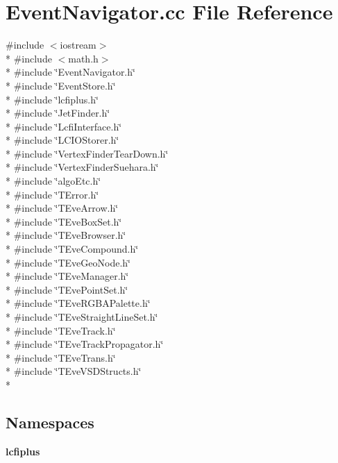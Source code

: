 \section{Event\-Navigator.\-cc File Reference}
\label{EventNavigator_8cc}
{\ttfamily \#include $<$iostream$>$}\\*
{\ttfamily \#include $<$math.\-h$>$}\\*
{\ttfamily \#include \char`\"{}Event\-Navigator.\-h\char`\"{}}\\*
{\ttfamily \#include \char`\"{}Event\-Store.\-h\char`\"{}}\\*
{\ttfamily \#include \char`\"{}lcfiplus.\-h\char`\"{}}\\*
{\ttfamily \#include \char`\"{}Jet\-Finder.\-h\char`\"{}}\\*
{\ttfamily \#include \char`\"{}Lcfi\-Interface.\-h\char`\"{}}\\*
{\ttfamily \#include \char`\"{}L\-C\-I\-O\-Storer.\-h\char`\"{}}\\*
{\ttfamily \#include \char`\"{}Vertex\-Finder\-Tear\-Down.\-h\char`\"{}}\\*
{\ttfamily \#include \char`\"{}Vertex\-Finder\-Suehara.\-h\char`\"{}}\\*
{\ttfamily \#include \char`\"{}algo\-Etc.\-h\char`\"{}}\\*
{\ttfamily \#include \char`\"{}T\-Error.\-h\char`\"{}}\\*
{\ttfamily \#include \char`\"{}T\-Eve\-Arrow.\-h\char`\"{}}\\*
{\ttfamily \#include \char`\"{}T\-Eve\-Box\-Set.\-h\char`\"{}}\\*
{\ttfamily \#include \char`\"{}T\-Eve\-Browser.\-h\char`\"{}}\\*
{\ttfamily \#include \char`\"{}T\-Eve\-Compound.\-h\char`\"{}}\\*
{\ttfamily \#include \char`\"{}T\-Eve\-Geo\-Node.\-h\char`\"{}}\\*
{\ttfamily \#include \char`\"{}T\-Eve\-Manager.\-h\char`\"{}}\\*
{\ttfamily \#include \char`\"{}T\-Eve\-Point\-Set.\-h\char`\"{}}\\*
{\ttfamily \#include \char`\"{}T\-Eve\-R\-G\-B\-A\-Palette.\-h\char`\"{}}\\*
{\ttfamily \#include \char`\"{}T\-Eve\-Straight\-Line\-Set.\-h\char`\"{}}\\*
{\ttfamily \#include \char`\"{}T\-Eve\-Track.\-h\char`\"{}}\\*
{\ttfamily \#include \char`\"{}T\-Eve\-Track\-Propagator.\-h\char`\"{}}\\*
{\ttfamily \#include \char`\"{}T\-Eve\-Trans.\-h\char`\"{}}\\*
{\ttfamily \#include \char`\"{}T\-Eve\-V\-S\-D\-Structs.\-h\char`\"{}}\\*
\subsection*{Namespaces}
\begin{DoxyCompactItemize}
\item 
{\bf lcfiplus}
\end{DoxyCompactItemize}
